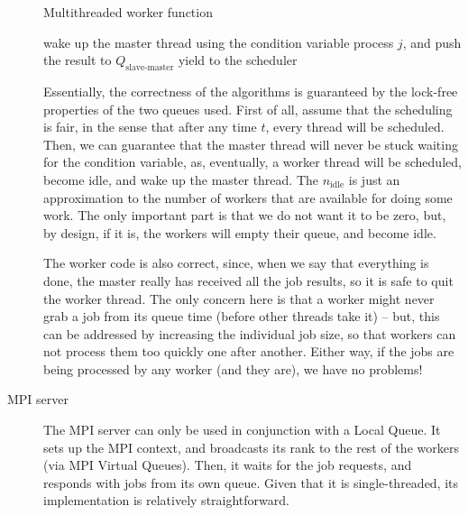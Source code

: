 \documentclass[a4paper]{article}
\begin{document}
\begin{description}
		\begin{algorithm}
			\caption{Multithreaded worker function} \label{alg:multithreaded worker function}
			\begin{algorithmic}[1]
						\State wake up the master thread using the condition variable
							\State process $j$, and push the result to $Q_\text{slave-master}$
						\EndWhile
						\State yield to the scheduler
					\EndWhile
				\EndProcedure
			\end{algorithmic}
		\end{algorithm}
	
		Essentially, the correctness of the algorithms is guaranteed by the lock-free properties of the two queues used. First of all, assume that the scheduling is fair, in the sense that after any time $t$, every thread will be scheduled. Then, we can guarantee that the master thread will never be stuck waiting for the condition variable, as, eventually, a worker thread will be scheduled, become idle, and wake up the master thread. The $n_\text{idle}$ is just an approximation to the number of workers that are available for doing some work. The only important part is that we do not want it to be zero, but, by design, if it is, the workers will empty their queue, and become idle.
		
		The worker code is also correct, since, when we say that everything is done, the master really has received all the job results, so it is safe to quit the worker thread. The only concern here is that a worker might never grab a job from its queue time (before other threads take it) -- but, this can be addressed by increasing the individual job size, so that workers can not process them too quickly one after another. Either way, if the jobs are being processed by any worker (and they are), we have no problems!
		
		\item[MPI server] The MPI server can only be used in conjunction with a Local Queue. It sets up the MPI context, and broadcasts its rank to the rest of the workers (via MPI Virtual Queues). Then, it waits for the job requests, and responds with jobs from its own queue. Given that it is single-threaded, its implementation is relatively straightforward.
	\end{description}
\end{document}
